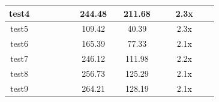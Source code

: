 \documentclass[conference]{IEEEtran}
\begin{document}
\begin{table}[!htbp]
\begin{tabular}{|c|llllc|cccllcll|}
    test4                   & \multicolumn{1}{l|}{}   & \multicolumn{1}{l|}{}   & \multicolumn{1}{l|}{}      & \multicolumn{1}{l|}{}           &         & \multicolumn{1}{c|}{244.48} & \multicolumn{1}{c|}{}   & \multicolumn{1}{c|}{211.68}  & \multicolumn{1}{l|}{}           & \multicolumn{1}{l|}{}        & \multicolumn{1}{c|}{2.3x}  & \multicolumn{1}{l|}{}           &                              \\ \hline
    test5                   & \multicolumn{1}{l|}{}   & \multicolumn{1}{l|}{}   & \multicolumn{1}{l|}{}      & \multicolumn{1}{l|}{}           &         & \multicolumn{1}{c|}{109.42} & \multicolumn{1}{c|}{}   & \multicolumn{1}{c|}{40.39}   & \multicolumn{1}{l|}{}           & \multicolumn{1}{l|}{}        & \multicolumn{1}{c|}{2.3x}  & \multicolumn{1}{l|}{}           &                              \\ \hline
    test6                   & \multicolumn{1}{l|}{}   & \multicolumn{1}{l|}{}   & \multicolumn{1}{l|}{}      & \multicolumn{1}{l|}{}           &         & \multicolumn{1}{c|}{165.39} & \multicolumn{1}{c|}{}   & \multicolumn{1}{c|}{77.33}   & \multicolumn{1}{l|}{}           & \multicolumn{1}{l|}{}        & \multicolumn{1}{c|}{2.1x}  & \multicolumn{1}{l|}{}           &                              \\ \hline
    test7                   & \multicolumn{1}{l|}{}   & \multicolumn{1}{l|}{}   & \multicolumn{1}{l|}{}      & \multicolumn{1}{l|}{}           &         & \multicolumn{1}{c|}{246.12} & \multicolumn{1}{c|}{}   & \multicolumn{1}{c|}{111.98}  & \multicolumn{1}{l|}{}           & \multicolumn{1}{l|}{}        & \multicolumn{1}{c|}{2.2x}  & \multicolumn{1}{l|}{}           &                              \\ \hline
    test8                   & \multicolumn{1}{l|}{}   & \multicolumn{1}{l|}{}   & \multicolumn{1}{l|}{}      & \multicolumn{1}{l|}{}           &         & \multicolumn{1}{c|}{256.73} & \multicolumn{1}{c|}{}   & \multicolumn{1}{c|}{125.29}  & \multicolumn{1}{l|}{}           & \multicolumn{1}{l|}{}        & \multicolumn{1}{c|}{2.1x}  & \multicolumn{1}{l|}{}           &                              \\ \hline
    test9                   & \multicolumn{1}{l|}{}   & \multicolumn{1}{l|}{}   & \multicolumn{1}{l|}{}      & \multicolumn{1}{l|}{}           &         & \multicolumn{1}{c|}{264.21} & \multicolumn{1}{c|}{}   & \multicolumn{1}{c|}{128.19}  & \multicolumn{1}{l|}{}           & \multicolumn{1}{l|}{}        & \multicolumn{1}{c|}{2.1x}  & \multicolumn{1}{l|}{}           &                              \\ \hline

\end{tabular}
\end{table}
\end{document}
